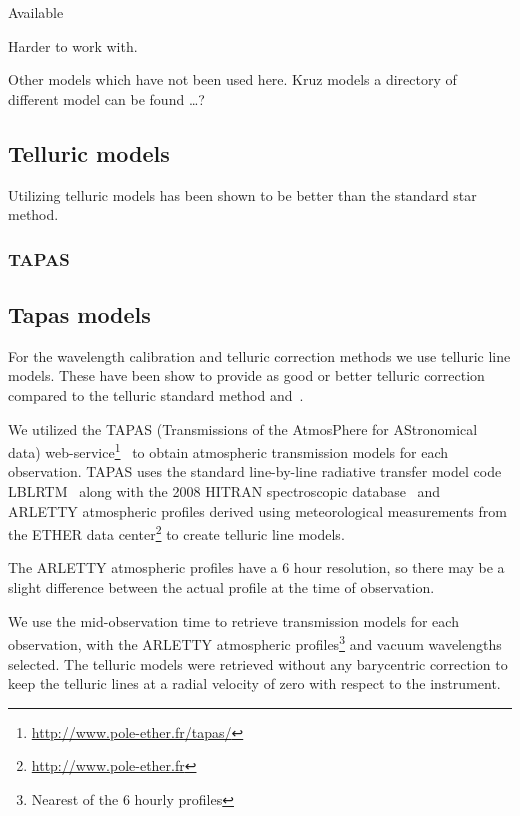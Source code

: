 Available  

Harder to work with.

Other models which have not been used here. Kruz models a directory of different model can be found \ldots{}?

\subsection{Telluric models}

Utilizing telluric models has been shown to be better than the standard star method.
\subsubsection{TAPAS}

\subsection{Tapas models}
\label{subsec:tapas_models}
For the wavelength calibration and telluric correction methods we use telluric line models. These have been show to provide as good or better telluric correction compared to the telluric standard method and~\citep{ulmer-moll_telluric_2018}.

We utilized the {TAPAS} (Transmissions of the AtmosPhere for AStronomical data) web-service\footnote{\url{http://www.pole-ether.fr/tapas/}}~\citep{bertaux_tapas_2014} to obtain atmospheric transmission models for each observation. {TAPAS} uses the standard line-by-line radiative transfer model code LBLRTM~\citep{clough_linebyline_1995} along with the 2008 {HITRAN} spectroscopic database~\citep{rothman_hitran_2009} and {ARLETTY} atmospheric profiles derived using meteorological measurements from the {ETHER} data center\footnote{\url{http://www.pole-ether.fr}} to create telluric line models.

The {ARLETTY} atmospheric profiles have a 6 hour resolution, so there may be a slight difference between the actual profile at the time of observation.

We use the mid-observation time to retrieve transmission models for each observation, with the {ARLETTY} atmospheric profiles\footnote{Nearest of the 6 hourly profiles} and vacuum wavelengths selected. The telluric models were retrieved without any barycentric correction to keep the telluric lines at a radial velocity of zero with respect to the instrument.

